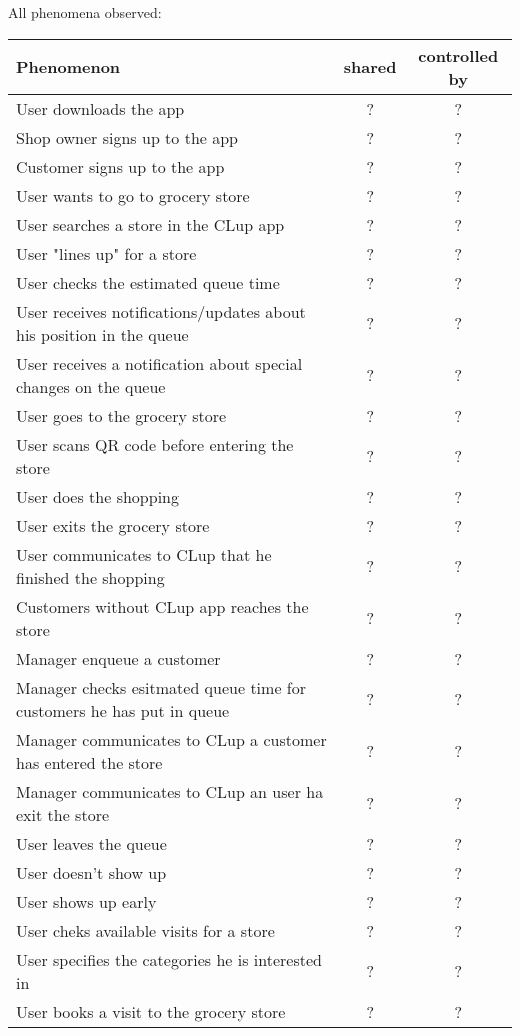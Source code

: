 All phenomena observed:

\begin{tabular}{|l|c|c|}
    \hline
    \textbf{Phenomenon} & \textbf{shared} & \textbf{controlled by}\\
    \hline
    User downloads the app & ? & ? \\
    Shop owner signs up to the app & ? & ? \\
    Customer signs up to the app & ? & ? \\
    \hline
    User wants to go to grocery store & ? & ? \\
    User searches a store in the CLup app & ? & ? \\
    User "lines up" for a store & ? & ? \\
    User checks the estimated queue time & ? & ? \\
    User receives notifications/updates about his position in the queue & ? & ? \\
    User receives a notification about special changes on the queue & ? & ? \\
    User goes to the grocery store & ? & ? \\
    User scans QR code before entering the store & ? & ? \\
    User does the shopping & ? & ? \\
    User exits the grocery store & ? & ? \\
    User communicates to CLup that he finished the shopping & ? & ? \\
    Customers without CLup app reaches the store & ? & ? \\
    Manager enqueue a customer & ? & ? \\
    Manager checks esitmated queue time for customers he has put in queue & ? & ? \\
    Manager communicates to CLup a customer has entered the store & ? & ? \\
    Manager communicates to CLup an user ha exit the store & ? & ? \\
    User leaves the queue & ? & ? \\
    User doesn't show up & ? & ? \\
    User shows up early & ? & ? \\
    \hline
    User cheks available visits for a store & ? & ? \\
    User specifies the categories he is interested in & ? & ? \\
    User books a visit to the grocery store & ? & ? \\

\end{tabular}
